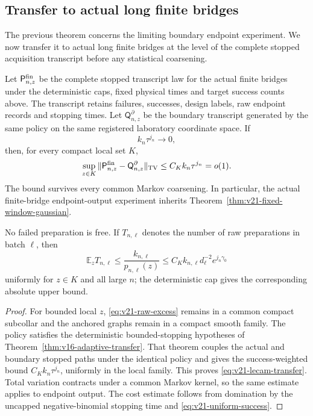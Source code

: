 \subsection{Transfer to actual long finite bridges}

The previous theorem concerns the limiting boundary endpoint experiment.  We
now transfer it to actual long finite bridges at the level of the complete
stopped acquisition transcript before any statistical coarsening.

\begin{theorem}
\label{thm:v21-stopped-local-transfer}
Let $\mathsf P_{n,z}^{\rm fin}$ be the complete stopped transcript law for the
actual finite bridges under the deterministic caps, fixed physical times and
target success counts above.  The transcript retains failures, successes,
design labels, raw endpoint records and stopping times.  Let
$\mathsf Q_{n,z}^{\partial}$ be the boundary transcript generated by the same
policy on the same registered laboratory coordinate space.  If
\begin{equation}\label{eq:v21-transfer-condition}
                         k_n\tau^{j_n}\longrightarrow0,
\end{equation}
then, for every compact local set $K$,
\begin{equation}\label{eq:v21-lecam-transfer}
 \sup_{z\in K}
 \|\mathsf P_{n,z}^{\rm fin}-\mathsf Q_{n,z}^{\partial}\|_{\rm TV}
 \le C_Kk_n\tau^{j_n}=o(1).
\end{equation}
The bound survives every common Markov coarsening.  In particular, the actual
finite-bridge endpoint-output experiment inherits
Theorem~\ref{thm:v21-fixed-window-gaussian}.

No failed preparation is free.  If $T_{n,\ell}$ denotes the number of raw
preparations in batch $\ell$, then
\begin{equation}\label{eq:v21-physical-cost}
 \mathbb E_zT_{n,\ell}
 \le \frac{k_{n,\ell}}{p_{n,\ell}(z)}
 \le C_Kk_{n,\ell}d_\ell^{-2}e^{j_n\gamma_0}
\end{equation}
uniformly for $z\in K$ and all large $n$; the deterministic cap gives the
corresponding absolute upper bound.
\end{theorem}

\begin{proof}
For bounded local $z$, \eqref{eq:v21-raw-excess} remains in a common compact
subcollar and the anchored graphs remain in a compact smooth family.  The
policy satisfies the deterministic bounded-stopping hypotheses of
Theorem~\ref{thm:v16-adaptive-transfer}.  That theorem couples the actual and
boundary stopped paths under the identical policy and gives the
success-weighted bound $C_Kk_n\tau^{j_n}$, uniformly in the local family.
This proves \eqref{eq:v21-lecam-transfer}.  Total variation contracts under a
common Markov kernel, so the same estimate applies to endpoint output.  The
cost estimate follows from domination by the uncapped negative-binomial
stopping time and \eqref{eq:v21-uniform-success}.
\end{proof}

